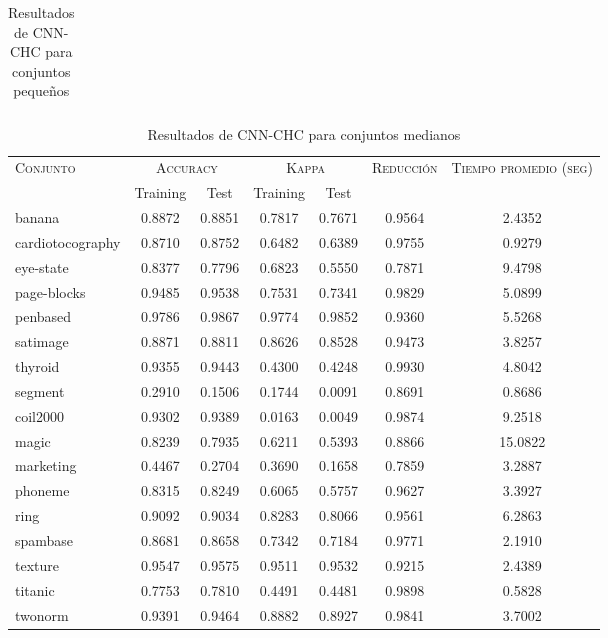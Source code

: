 \begin{table}[]
\begin{tabular}{l c c c c c c}
\hline
\end{tabular}
\caption{Resultados de CNN-CHC para conjuntos pequeños }
\label{res-peq-CNN-CHC}
\end{table}


\begin{table}[]
\centering
\begin{tabular}{l c c c c c c}
\hline
\multirow{2}{*}{\textsc{Conjunto}}
	& \multicolumn{2}{c}{\textsc{Accuracy}}
	& \multicolumn{2}{c}{\textsc{Kappa}}
	& \textsc{Reducción}
	& \textsc{Tiempo promedio (seg)} \\
	& Training & Test
	& Training & Test \\ 
\hline
\hline

banana & 0.8872 & 0.8851 & 0.7817 & 0.7671 & 0.9564 & 2.4352 \\
cardiotocography & 0.8710 & 0.8752 & 0.6482 & 0.6389 & 0.9755 & 0.9279 \\
eye-state & 0.8377 & 0.7796 & 0.6823 & 0.5550 & 0.7871 & 9.4798 \\
page-blocks & 0.9485 & 0.9538 & 0.7531 & 0.7341 & 0.9829 & 5.0899 \\
penbased & 0.9786 & 0.9867 & 0.9774 & 0.9852 & 0.9360 & 5.5268 \\
satimage & 0.8871 & 0.8811 & 0.8626 & 0.8528 & 0.9473 & 3.8257 \\
thyroid & 0.9355 & 0.9443 & 0.4300 & 0.4248 & 0.9930 & 4.8042 \\
segment & 0.2910 & 0.1506 & 0.1744 & 0.0091 & 0.8691 & 0.8686 \\
coil2000 & 0.9302 & 0.9389 & 0.0163 & 0.0049 & 0.9874 & 9.2518 \\
magic & 0.8239 & 0.7935 & 0.6211 & 0.5393 & 0.8866 & 15.0822 \\
marketing & 0.4467 & 0.2704 & 0.3690 & 0.1658 & 0.7859 & 3.2887 \\
phoneme & 0.8315 & 0.8249 & 0.6065 & 0.5757 & 0.9627 & 3.3927 \\
ring & 0.9092 & 0.9034 & 0.8283 & 0.8066 & 0.9561 & 6.2863 \\
spambase & 0.8681 & 0.8658 & 0.7342 & 0.7184 & 0.9771 & 2.1910 \\
texture & 0.9547 & 0.9575 & 0.9511 & 0.9532 & 0.9215 & 2.4389 \\
titanic & 0.7753 & 0.7810 & 0.4491 & 0.4481 & 0.9898 & 0.5828 \\
twonorm & 0.9391 & 0.9464 & 0.8882 & 0.8927 & 0.9841 & 3.7002 \\

\hline
\end{tabular}
\caption{Resultados de CNN-CHC para conjuntos medianos }
\label{res-med-CNN-CHC}
\end{table}


